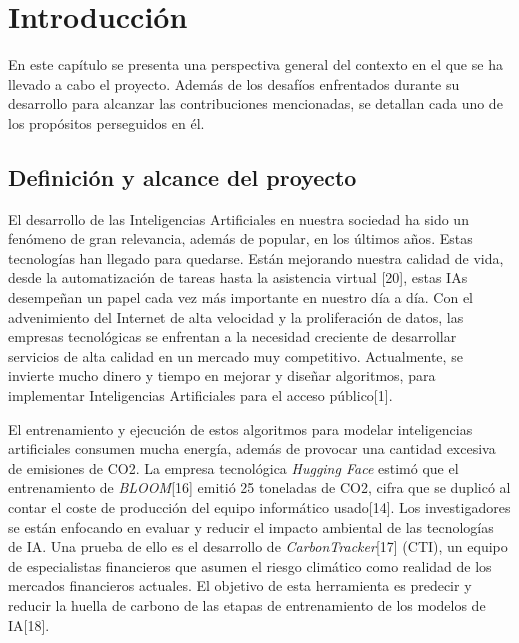 \chapter{Introducción}

En este capítulo se presenta una perspectiva general del contexto en el que se ha llevado a cabo el proyecto. Además de los desafíos enfrentados durante su desarrollo para alcanzar las contribuciones mencionadas, se detallan cada uno de los propósitos perseguidos en él.


\section{Definición y alcance del proyecto}

El desarrollo de las Inteligencias Artificiales en nuestra sociedad ha sido un fenómeno de gran relevancia, además de popular, en los últimos años. Estas tecnologías han llegado para quedarse. Están mejorando nuestra calidad de vida, desde la automatización de tareas hasta la asistencia virtual [20], estas IAs desempeñan un papel cada vez más importante en nuestro día a día.
Con el advenimiento del Internet de alta velocidad y la proliferación de datos, las empresas tecnológicas se enfrentan a la necesidad creciente de desarrollar servicios de alta calidad en un mercado muy competitivo. Actualmente, se invierte mucho dinero y tiempo en mejorar y diseñar algoritmos, para implementar Inteligencias Artificiales para el acceso público[1].

El entrenamiento y ejecución de estos algoritmos para modelar inteligencias artificiales consumen mucha energía, además de provocar una cantidad excesiva de emisiones de CO2. La empresa tecnológica \textit{Hugging Face} estimó que el entrenamiento de \textit{BLOOM}[16] emitió 25 toneladas de CO2, cifra que se duplicó al contar el coste de producción del equipo informático usado[14]. Los investigadores se están enfocando en evaluar y reducir el impacto ambiental de las tecnologías de IA. Una prueba de ello es el desarrollo de \textit{CarbonTracker}[17] (CTI), un equipo de especialistas financieros que asumen el riesgo climático como realidad de los mercados financieros actuales. El objetivo de esta herramienta es predecir y reducir la huella de carbono de las etapas de entrenamiento de los modelos de IA[18].


